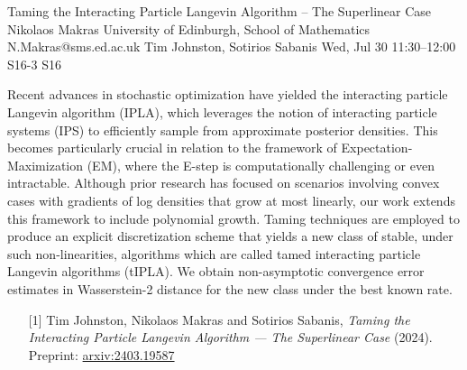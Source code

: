 \begin{talk}
  {Taming the Interacting Particle Langevin Algorithm – The Superlinear Case}%
  {Nikolaos Makras}%
  {University of Edinburgh, School of Mathematics}%
  {N.Makras@sms.ed.ac.uk}%
  {Tim Johnston, Sotirios Sabanis}%
  {}%
  {Wed, Jul 30 11:30–12:00}%
  {S16-3}%
  {S16}%
  
				
			
Recent advances in stochastic optimization have yielded the interacting particle Langevin algorithm (IPLA), which leverages the notion of interacting particle systems (IPS) to efficiently sample from approximate posterior densities. This becomes particularly crucial in relation to the framework of Expectation-Maximization (EM), where the E-step is computationally challenging or even intractable. Although prior research has focused on scenarios involving convex cases with gradients of log densities that grow at most linearly, our work extends this framework to include polynomial growth. Taming techniques are employed to produce an explicit discretization scheme that yields a new class of stable, under such non-linearities, algorithms which are called tamed interacting particle Langevin algorithms (tIPLA). We obtain non-asymptotic convergence error estimates in Wasserstein-2 distance for the new class under the best known rate. 

\medskip

\begin{enumerate}
	\item[{[1]}] Tim Johnston, Nikolaos Makras and Sotirios Sabanis, {\it Taming the Interacting Particle Langevin Algorithm --- The Superlinear Case} (2024). Preprint: \href{https://arxiv.org/abs/2403.19587}{arxiv:2403.19587} 
\end{enumerate}

\end{talk}

